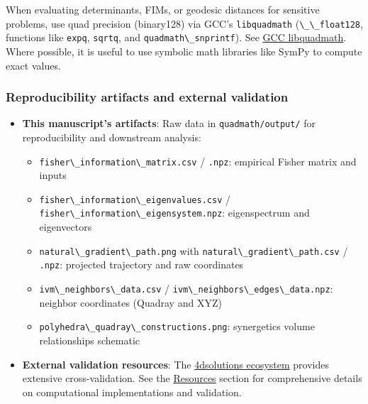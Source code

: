 \documentclass[
  10pt,
]{article}
\newcommand{\passthrough}[1]{#1}
\providecommand{\tightlist}{%
  \setlength{\itemsep}{0pt}\setlength{\parskip}{0pt}}
\begin{document}
When evaluating determinants, FIMs, or geodesic distances for sensitive
problems, use quad precision (binary128) via GCC's
\passthrough{\lstinline!libquadmath!}
(\passthrough{\lstinline!\_\_float128!}, functions like
\passthrough{\lstinline!expq!}, \passthrough{\lstinline!sqrtq!}, and
\passthrough{\lstinline!quadmath\_snprintf!}). See
\href{https://gcc.gnu.org/onlinedocs/libquadmath/index.html}{GCC
libquadmath}. Where possible, it is useful to use symbolic math
libraries like SymPy to compute exact values.

\hypertarget{reproducibility-artifacts-and-external-validation}{%
\subsubsection{Reproducibility artifacts and external
validation}\label{reproducibility-artifacts-and-external-validation}}

\begin{itemize}
\tightlist
\item
  \textbf{This manuscript's artifacts}: Raw data in
  \passthrough{\lstinline!quadmath/output/!} for reproducibility and
  downstream analysis:

  \begin{itemize}
  \item
    \passthrough{\lstinline!fisher\_information\_matrix.csv!} /
    \passthrough{\lstinline!.npz!}: empirical Fisher matrix and inputs
  \item
    \passthrough{\lstinline!fisher\_information\_eigenvalues.csv!} /
    \passthrough{\lstinline!fisher\_information\_eigensystem.npz!}:
    eigenspectrum and eigenvectors
  \item
    \passthrough{\lstinline!natural\_gradient\_path.png!} with
    \passthrough{\lstinline!natural\_gradient\_path.csv!} /
    \passthrough{\lstinline!.npz!}: projected trajectory and raw
    coordinates
  \item
    \passthrough{\lstinline!ivm\_neighbors\_data.csv!} /
    \passthrough{\lstinline!ivm\_neighbors\_edges\_data.npz!}: neighbor
    coordinates (Quadray and XYZ)
  \item
    \passthrough{\lstinline!polyhedra\_quadray\_constructions.png!}:
    synergetics volume relationships schematic
  \end{itemize}
\item
  \textbf{External validation resources}: The
  \href{https://github.com/4dsolutions}{4dsolutions ecosystem} provides
  extensive cross-validation. See the \href{07_resources.md}{Resources}
  section for comprehensive details on computational implementations and
  validation.
\end{itemize}
\end{document}
